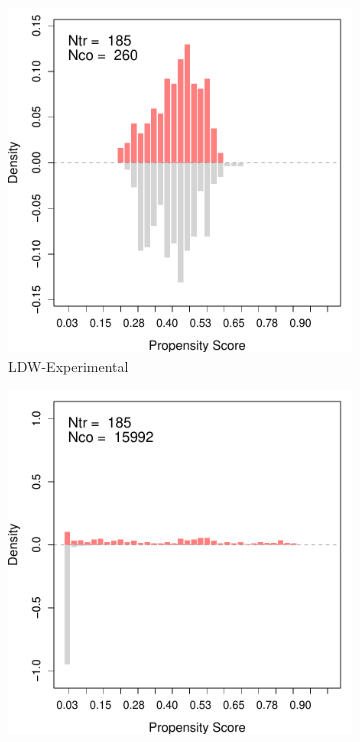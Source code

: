 \documentclass[letterpaper,12pt,leqno]{article}
\begin{document}
\begin{figure}[!ht]
    \caption{Assessing Overlaps in LDW Data: Propensity Scores}\label{fig:overlap.ps}
    \centering
    \begin{minipage}[c]{.3\textwidth}
        \centering
        \begin{subfigure}{\linewidth} 
            \includegraphics[width=\linewidth]{ps_ldw_exp.pdf}
            \caption{LDW-Experimental}
        \end{subfigure}
    \end{minipage}%
    \begin{minipage}[c]{.65\textwidth}
        \centering
        \begin{subfigure}{0.45\linewidth}
            \includegraphics[width=\linewidth]{ps_ldw_cps.pdf}

\end{subfigure}
\end{minipage}
\end{figure}
\end{document}
